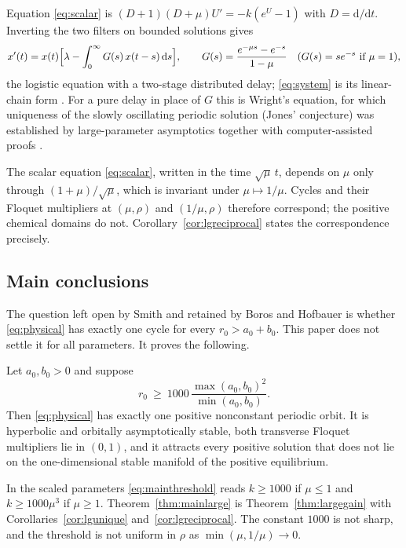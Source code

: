 Equation \eqref{eq:scalar} is $(D+1)(D+\mu)U'=-k(e^U-1)$ with $D=\mathrm d/\mathrm dt$. Inverting the two filters on bounded solutions gives
\begin{equation}\label{eq:delay}
x'(t)=x(t)\Bigl[\lambda-\int_0^\infty G(s)\,x(t-s)\,\mathrm ds\Bigr],\qquad
G(s)=\frac{e^{-\mu s}-e^{-s}}{1-\mu}\quad(G(s)=se^{-s}\text{ if }\mu=1),
\end{equation}
the logistic equation with a two-stage distributed delay; \eqref{eq:system} is its linear-chain form \cite{Ruan06}. For a pure delay in place of $G$ this is Wright's equation, for which uniqueness of the slowly oscillating periodic solution (Jones' conjecture) was established by large-parameter asymptotics together with computer-assisted proofs \cite{Xie93,JLM17,vdBJ18,Jaquette19}.

The scalar equation \eqref{eq:scalar}, written in the time $\sqrt\mu\,t$, depends on $\mu$ only through $(1+\mu)/\sqrt\mu$, which is invariant under $\mu\mapsto1/\mu$. Cycles and their Floquet multipliers at $(\mu,\rho)$ and $(1/\mu,\rho)$ therefore correspond; the positive chemical domains do not. Corollary~\ref{cor:lgreciprocal} states the correspondence precisely.

\subsection{Main conclusions}
The question left open by Smith \cite{Smith12} and retained by Boros and Hofbauer \cite{BH23} is whether \eqref{eq:physical} has exactly one cycle for every $r_0>a_0+b_0$. This paper does not settle it for all parameters. It proves the following.

\begin{theorem}\label{thm:mainlarge}
Let $a_0,b_0>0$ and suppose
\begin{equation}\label{eq:mainthreshold}
r_0\ \ge\ 1000\,\frac{\max(a_0,b_0)^2}{\min(a_0,b_0)} .
\end{equation}
Then \eqref{eq:physical} has exactly one positive nonconstant periodic orbit. It is hyperbolic and orbitally asymptotically stable, both transverse Floquet multipliers lie in $(0,1)$, and it attracts every positive solution that does not lie on the one-dimensional stable manifold of the positive equilibrium.
\end{theorem}
In the scaled parameters \eqref{eq:mainthreshold} reads $k\ge1000$ if $\mu\le1$ and $k\ge1000\mu^3$ if $\mu\ge1$. Theorem~\ref{thm:mainlarge} is Theorem~\ref{thm:largegain} with Corollaries~\ref{cor:lgunique} and~\ref{cor:lgreciprocal}. The constant $1000$ is not sharp, and the threshold is not uniform in $\rho$ as $\min(\mu,1/\mu)\to0$.

